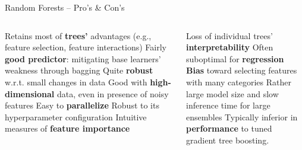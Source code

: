 
\begin{frame}{Random Forests -- Pro's \& Con's}

\begin{columns}[onlytextwidth]
  \begin{column}{0.5\textwidth}
    \footnotesize
    \begin{itemize}
      \positem Retains most of \textbf{trees'} advantages (e.g., feature selection, feature interactions)
      \positem Fairly \textbf{good predictor}: mitigating base learners' weakness through bagging
      \positem Quite \textbf{robust} w.r.t. small changes in data
      \positem Good with \textbf{high-dimensional} data, even in presence of noisy features
      \positem Easy to \textbf{parallelize}
      \positem Robust to its hyperparameter configuration
      \positem Intuitive measures of \textbf{feature importance}
    \end{itemize}
  \end{column}
  \begin{column}{0.5\textwidth}
    \footnotesize
    \begin{itemize}
      \negitem Loss of individual trees' \textbf{interpretability}
      \negitem Often suboptimal for \textbf{regression}
      \negitem \textbf{Bias} toward selecting features with many categories
      \negitem Rather large model size and slow inference time for large ensembles
      \negitem Typically inferior in \textbf{performance} to tuned gradient tree boosting.
    \end{itemize}
  \end{column}
\end{columns}

\vfill

\small


\end{frame}


